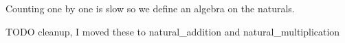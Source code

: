 

Counting one by one is slow so we define
an algebra on the naturals.

TODO cleanup, I moved these to natural_addition and natural_multiplication




